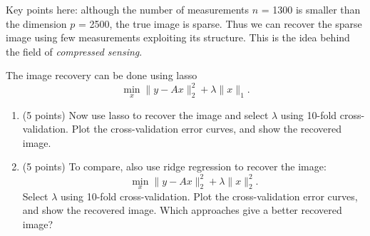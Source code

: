 \documentclass[twoside,10pt]{article}
\begin{document}
\begin{enumerate}
Key points here: although the number of measurements $n$ = 1300 is smaller than the dimension $p$ = 2500, the true image is sparse. Thus we can recover the sparse image using few measurements exploiting its structure. This is the idea behind the field of \textit{compressed sensing}. 

The image recovery can be done using lasso
\[
\min_x \|y-Ax\|_2^2 + \lambda \|x\|_1.
\]
\begin{enumerate}
\item (5 points) Now use lasso to recover the image and select $\lambda$ using 10-fold cross-validation. Plot the cross-validation error curves, and show the recovered image. 
\item (5 points) To compare, also use ridge regression to recover the image:
\[
\min_x \|y-Ax\|_2^2 + \lambda \|x\|_2^2.
\]
Select $\lambda$ using 10-fold cross-validation. Plot the cross-validation error curves, and show the recovered image. Which approaches give a better recovered image?
\end{enumerate}



\end{enumerate}
\end{document}
